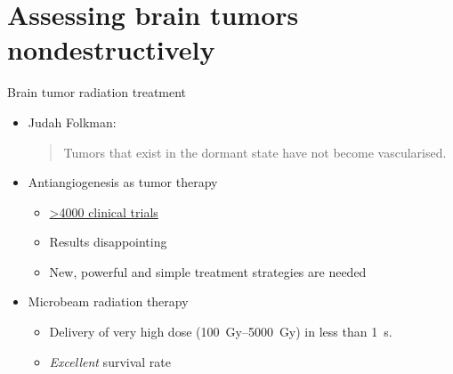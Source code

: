 \documentclass[caption=numbered]{beamer}
\begin{document}
\section{Assessing brain tumors nondestructively}
\label{sec:grenoble}
\begin{frame}{Brain tumor radiation treatment}
	\begin{itemize}
		\item Judah Folkman: \blockquote[\cite{Sherwood1971}]{Tumors that exist in the dormant state have not become vascularised.}
		\pause
		\item Antiangiogenesis as tumor therapy
		\begin{itemize}
			\item \href{https://clinicaltrials.gov/ct2/results?term=antiangiogenic}{\textgreater4000 clinical trials}
			\item Results disappointing
			\item New, powerful and simple treatment strategies are needed
		\end{itemize}
		\pause
		\item Microbeam radiation therapy
		\begin{itemize}
			\item Delivery of very high dose (\SIrange{100}{5000}{\gray}) in less than \SI{1}{\second}.
			\item \emph{Excellent} survival rate \cite{Laissue1998}
		\end{itemize}
	\end{itemize}
\end{frame}
\end{document}
